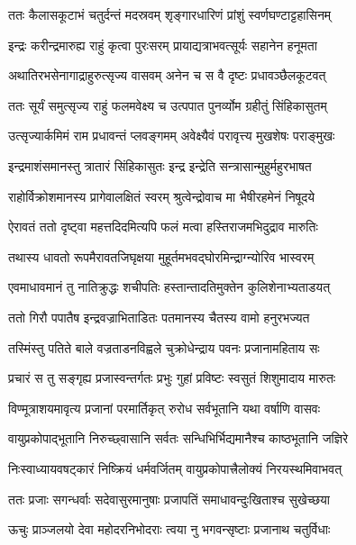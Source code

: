 \twolineshloka
{ततः कैलासकूटाभं चतुर्दन्तं मदस्रवम्}
{शृङ्गारधारिणं प्रांशुं स्वर्णघण्टाट्टहासिनम्} %

\twolineshloka
{इन्द्रः करीन्द्रमारुह्य राहुं कृत्वा पुरःसरम्}
{प्रायाद्यत्राभवत्सूर्यः सहानेन हनूमता} %

\twolineshloka
{अथातिरभसेनागाद्राहुरुत्सृज्य वासवम्}
{अनेन च स वै दृष्टः प्रधावञ्छैलकूटवत्} %

\twolineshloka
{ततः सूर्यं समुत्सृज्य राहुं फलमवेक्ष्य च}
{उत्पपात पुनर्व्योम ग्रहीतुं सिंहिकासुतम्} %

\twolineshloka
{उत्सृज्यार्कमिमं राम प्रधावन्तं प्लवङ्गमम्}
{अवेक्ष्यैवं परावृत्त्य मुखशेषः पराङ्मुखः} %

\twolineshloka
{इन्द्रमाशंसमानस्तु त्रातारं सिंहिकासुतः}
{इन्द्र इन्द्रेति सन्त्रासान्मुहुर्महुरभाषत} %

\twolineshloka
{राहोर्विक्रोशमानस्य प्रागेवालक्षितं स्वरम्}
{श्रुत्वेन्द्रोवाच मा भैषीरहमेनं निषूदये} %

\twolineshloka
{ऐरावतं ततो दृष्ट्वा महत्तदिदमित्यपि}
{फलं मत्वा हस्तिराजमभिदुद्राव मारुतिः} %

\twolineshloka
{तथास्य धावतो रूपमैरावतजिघृक्षया}
{मुहूर्तमभवद्घोरमिन्द्राग्न्योरिव भास्वरम्} %

\twolineshloka
{एवमाधावमानं तु नातिक्रुद्धः शचीपतिः}
{हस्तान्तादतिमुक्तेन कुलिशेनाभ्यताडयत्} %

\twolineshloka
{ततो गिरौ पपातैष इन्द्रवज्राभिताडितः}
{पतमानस्य चैतस्य वामो हनुरभज्यत} %

\twolineshloka
{तस्मिंस्तु पतिते बाले वज्रताडनविह्वले}
{चुक्रोधेन्द्राय पवनः प्रजानामहिताय सः} %

\twolineshloka
{प्रचारं स तु सङ्गृह्य प्रजास्वन्तर्गतः प्रभुः}
{गुहां प्रविष्टः स्वसुतं शिशुमादाय मारुतः} %

\twolineshloka
{विण्मूत्राशयमावृत्य प्रजानां परमार्तिकृत्}
{रुरोध सर्वभूतानि यथा वर्षाणि वासवः} %

\twolineshloka
{वायुप्रकोपाद्भूतानि निरुच्छ्वासानि सर्वतः}
{सन्धिभिर्भिद्यमानैश्च काष्ठभूतानि जज्ञिरे} %

\twolineshloka
{निःस्वाध्यायवषट्कारं निष्क्रियं धर्मवर्जितम्}
{वायुप्रकोपात्त्रैलोक्यं निरयस्थमिवाभवत्} %

\twolineshloka
{ततः प्रजाः सगन्धर्वाः सदेवासुरमानुषाः}
{प्रजापतिं समाधावन्दुःखिताश्च सुखेच्छया} %

\twolineshloka
{ऊचुः प्राञ्जलयो देवा महोदरनिभोदराः}
{त्वया नु भगवन्सृष्टाः प्रजानाथ चतुर्विधाः} %

